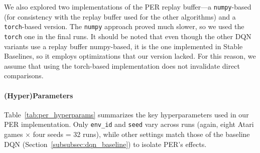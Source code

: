 We also explored two implementations of the PER replay buffer—a \texttt{numpy}-based (for consistency with the replay buffer used for the other algorithms) and a \texttt{torch}-based version. The \texttt{numpy} approach proved much slower, so we used the \texttt{torch} one in the final runs. It should be noted that even though the other DQN variants use a replay buffer numpy-based, it is the one implemented in Stable Baselines, so it employs optimizations that our version lacked. For this reason, we assume that using the torch-based implementation does not invalidate direct comparisons.

\paragraph{(Hyper)Parameters}
Table~\ref{tab:per_hyperparams} summarizes the key hyperparameters 
used in our PER implementation. 
Only \texttt{env\_id} and \texttt{seed} vary across runs 
(again, eight Atari games $\times$ four seeds = 32 runs), 
while other settings match those of the baseline DQN 
(Section~\ref{subsubsec:dqn_baseline}) to isolate PER's effects.

